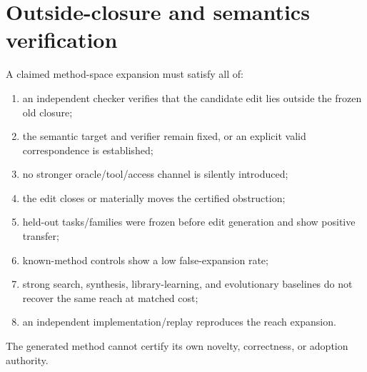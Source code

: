 \section{Outside-closure and semantics verification}
A claimed method-space expansion must satisfy all of:
\begin{enumerate}
    \item an independent checker verifies that the candidate edit lies outside the frozen old closure;
    \item the semantic target and verifier remain fixed, or an explicit valid correspondence is established;
    \item no stronger oracle/tool/access channel is silently introduced;
    \item the edit closes or materially moves the certified obstruction;
    \item held-out tasks/families were frozen before edit generation and show positive transfer;
    \item known-method controls show a low false-expansion rate;
    \item strong search, synthesis, library-learning, and evolutionary baselines do not recover the same reach at matched cost;
    \item an independent implementation/replay reproduces the reach expansion.
\end{enumerate}
The generated method cannot certify its own novelty, correctness, or adoption authority.

